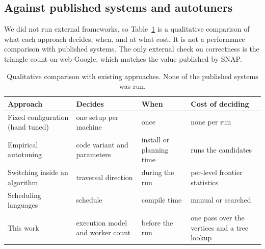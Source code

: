 \documentclass[conference]{IEEEtran}
\begin{document}
\subsection{Against published systems and autotuners}
We did not run external frameworks, so Table~\ref{tab:compare} is a qualitative comparison of what each approach decides, when, and at what cost. It is not a performance comparison with published systems. The only external check on correctness is the triangle count on web-Google, which matches the value published by SNAP.

\begin{table}[!tb]
\caption{Qualitative comparison with existing approaches. None of the published systems was run.}
\label{tab:compare}
\centering\footnotesize\setlength{\tabcolsep}{3pt}
\begin{tabular}{@{}p{}p{}p{}p{}@{}}
\toprule
Approach & Decides & When & Cost of deciding \\
\midrule
Fixed configuration (hand tuned) & one setup per machine & once & none per run \\
Empirical autotuning~\cite{atlas,fftw} & code variant and parameters & install or planning time & runs the candidates \\
Switching inside an algorithm~\cite{dobfs,ligra} & traversal direction & during the run & per-level frontier statistics \\
Scheduling languages~\cite{graphit} & schedule & compile time & manual or searched \\
This work & execution model and worker count & before the run & one pass over the vertices and a tree lookup \\
\bottomrule
\end{tabular}
\end{table}

\end{document}
